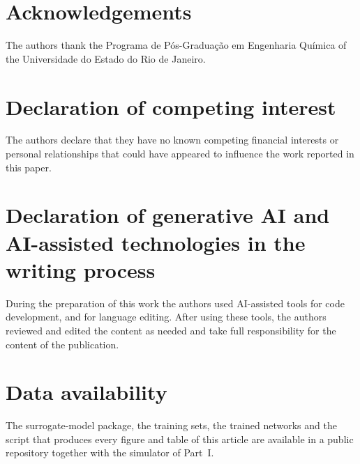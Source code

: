 \documentclass[a4paper,fleqn]{cas-sc}
\begin{document}
\section*{Acknowledgements}
The authors thank the Programa de P\'os-Gradua\c{c}\~ao em Engenharia Qu\'imica of the Universidade do Estado do Rio de Janeiro.

\section*{Declaration of competing interest}
The authors declare that they have no known competing financial interests or personal relationships that could have appeared to influence the work reported in this paper.

\section*{Declaration of generative AI and AI-assisted technologies in the writing process}
During the preparation of this work the authors used AI-assisted tools for code development, and for language editing. After using these tools, the authors reviewed and edited the content as needed and take full responsibility for the content of the publication.

\section*{Data availability}
The surrogate-model package, the training sets, the trained networks and the script that produces every figure and table of this article are available in a public repository together with the simulator of Part~I.




\end{document}
